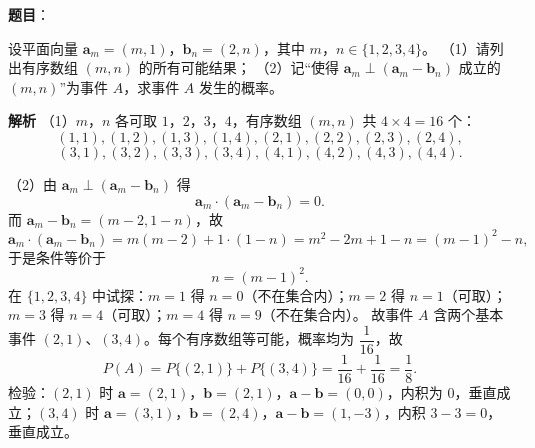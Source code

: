 \begin{answer}

\textbf{题目}：

设平面向量 $\boldsymbol a_m=(m,1)$，$\boldsymbol b_n=(2,n)$，其中 $m$，$n\in\{1,2,3,4\}$。
（1）请列出有序数组 $(m,n)$ 的所有可能结果；
（2）记“使得 $\boldsymbol a_m\perp(\boldsymbol a_m-\boldsymbol b_n)$ 成立的 $(m,n)$”为事件 $A$，求事件 $A$ 发生的概率。

\textbf{解析}
（1）$m$，$n$ 各可取 $1$，$2$，$3$，$4$，有序数组 $(m,n)$ 共 $4\times4=16$ 个：
\nopagebreak[4]
\[(1,1),(1,2),(1,3),(1,4),(2,1),(2,2),(2,3),(2,4),\]
\nopagebreak[4]
\[(3,1),(3,2),(3,3),(3,4),(4,1),(4,2),(4,3),(4,4).\]

（2）由 $\boldsymbol a_m\perp(\boldsymbol a_m-\boldsymbol b_n)$ 得
\nopagebreak[4]
\[\boldsymbol a_m\cdot(\boldsymbol a_m-\boldsymbol b_n)=0.\]
而 $\boldsymbol a_m-\boldsymbol b_n=(m-2,1-n)$，故
\nopagebreak[4]
\[\boldsymbol a_m\cdot(\boldsymbol a_m-\boldsymbol b_n)=m(m-2)+1\cdot(1-n)=m^2-2m+1-n=(m-1)^2-n,\]
于是条件等价于
\nopagebreak[4]
\[n=(m-1)^2.\]
在 $\{1,2,3,4\}$ 中试探：$m=1$ 得 $n=0$（不在集合内）；$m=2$ 得 $n=1$（可取）；$m=3$ 得 $n=4$（可取）；$m=4$ 得 $n=9$（不在集合内）。
故事件 $A$ 含两个基本事件 $(2,1)$、$(3,4)$。每个有序数组等可能，概率均为 $\dfrac1{16}$，故
\nopagebreak[4]
\[P(A)=P\{(2,1)\}+P\{(3,4)\}=\frac1{16}+\frac1{16}=\frac18.\]
检验：$(2,1)$ 时 $\boldsymbol a=(2,1)$，$\boldsymbol b=(2,1)$，$\boldsymbol a-\boldsymbol b=(0,0)$，内积为 $0$，垂直成立；$(3,4)$ 时 $\boldsymbol a=(3,1)$，$\boldsymbol b=(2,4)$，$\boldsymbol a-\boldsymbol b=(1,-3)$，内积 $3-3=0$，垂直成立。


\end{answer}
